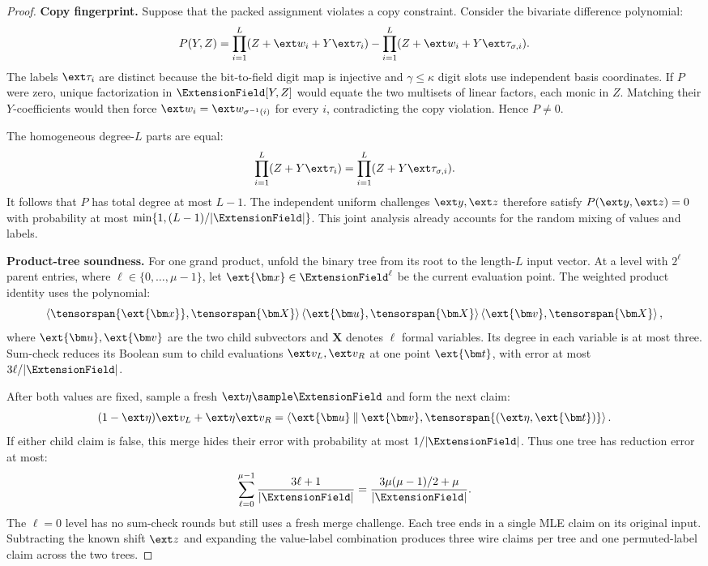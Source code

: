 \begin{proof}
\noindent\textbf{Copy fingerprint.}
Suppose that the packed assignment violates a copy constraint.
Consider the bivariate difference polynomial:
\[
    P(Y,Z)=
       \prod_{i=1}^{L}(Z+\ext w_i+Y\ext\tau_i)
       -\prod_{i=1}^{L}(Z+\ext w_i+Y\ext\tau_{\sigma,i}).
\]
The labels \(\ext\tau_i\) are distinct because the bit-to-field
digit map is injective and \(\gamma\leq\kappa\) digit slots use
independent basis coordinates.
If \(P\) were zero, unique factorization in
\(\ExtensionField[Y,Z]\) would equate the two multisets of
linear factors, each monic in \(Z\).
Matching their \(Y\)-coefficients would then force
\(\ext w_i=\ext w_{\sigma^{-1}(i)}\) for every \(i\),
contradicting the copy violation. Hence \(P\ne0\).

The homogeneous degree-\(L\) parts are equal:
\[
    \prod_{i=1}^{L}(Z+Y\ext\tau_i)
       =\prod_{i=1}^{L}(Z+Y\ext\tau_{\sigma,i}).
\]
It follows that \(P\) has total degree at most \(L-1\).
The independent uniform challenges \(\ext y,\ext z\) therefore
satisfy \(P(\ext y,\ext z)=0\) with probability at most
\(\min\{1,(L-1)/|\ExtensionField|\}\).
This joint analysis already accounts for the random mixing
of values and labels.

\noindent\textbf{Product-tree soundness.}
For one grand product, unfold the binary tree from its root
to the length-\(L\) input vector.
At a level with \(2^\ell\) parent entries, where
\(\ell\in\{0,\ldots,\mu-1\}\), let
\(\ext{\bm x}\in\ExtensionField^\ell\) be the current
evaluation point.
The weighted product identity uses the polynomial:
\[
    \left\langle
       \tensorspan{\ext{\bm x}},\tensorspan{\bm X}
    \right\rangle
    \left\langle\ext{\bm u},\tensorspan{\bm X}\right\rangle
    \left\langle\ext{\bm v},\tensorspan{\bm X}\right\rangle,
\]
where \(\ext{\bm u},\ext{\bm v}\) are the two child subvectors
and \(\bm X\) denotes \(\ell\) formal variables.
Its degree in each variable is at most three.
Sum-check reduces its Boolean sum to child evaluations
\(\ext v_L,\ext v_R\) at one point \(\ext{\bm t}\), with
error at most \(3\ell/|\ExtensionField|\).

After both values are fixed, sample a fresh
\(\ext\eta\sample\ExtensionField\) and form the next claim:
\[
    (1-\ext\eta)\ext v_L+\ext\eta\ext v_R
       =
    \left\langle
       \ext{\bm u}\mathbin{\|}\ext{\bm v},
       \tensorspan{(\ext\eta,\ext{\bm t})}
    \right\rangle.
\]
If either child claim is false, this merge hides their error
with probability at most \(1/|\ExtensionField|\).
Thus one tree has reduction error at most:
\[
    \sum_{\ell=0}^{\mu-1}
       \frac{3\ell+1}{|\ExtensionField|}
       =
    \frac{3\mu(\mu-1)/2+\mu}{|\ExtensionField|}.
\]
The \(\ell=0\) level has no sum-check rounds but still uses
a fresh merge challenge.
Each tree ends in a single MLE claim on its original input.
Subtracting the known shift \(\ext z\) and expanding the
value-label combination produces three wire claims per tree
and one permuted-label claim across the two trees.


\end{proof}
